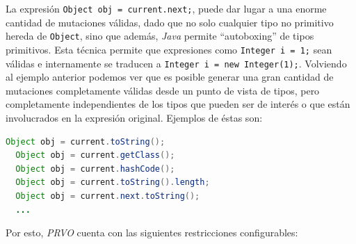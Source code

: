 La expresi\'on \lstinline|Object obj = current.next;|, puede dar lugar a una enorme cantidad de mutaciones v\'alidas, dado que no solo cualquier tipo no primitivo hereda de \texttt{Object}, sino que adem\'as, \emph{Java} permite ``autoboxing'' de tipos primitivos. Esta t\'ecnica permite que expresiones como \lstinline|Integer i = 1;| sean v\'alidas e internamente se traducen a \lstinline|Integer i = new Integer(1);|. Volviendo al ejemplo anterior podemos ver que es posible generar una gran cantidad de mutaciones completamente v\'alidas desde un punto de vista de tipos, pero completamente independientes de los tipos que pueden ser de inter\'es o que est\'an involucrados en la expresi\'on original. Ejemplos de \'estas son:
\begin{lstlisting}[language=Java,basicstyle={}]
  Object obj = current.toString();
  Object obj = current.getClass();
  Object obj = current.hashCode();
  Object obj = current.toString().length;
  Object obj = current.next.toString();
  ...
\end{lstlisting}

Por esto, \emph{PRVO} cuenta con las siguientes restricciones configurables:

